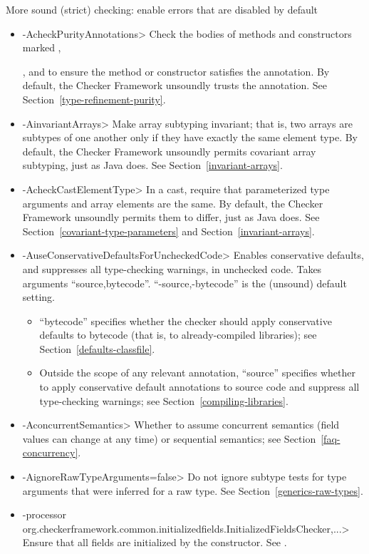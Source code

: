 \label{unsound-by-default}
More sound (strict) checking: enable errors that are disabled by default
\begin{itemize}
\item \<-AcheckPurityAnnotations>
  Check the bodies of methods and constructors marked
  ,

  ,
  and 
  to ensure the method or constructor satisfies the annotation.  By default,
  the Checker Framework unsoundly trusts the annotation.  See
  Section~\ref{type-refinement-purity}.
\item \<-AinvariantArrays>
  Make array subtyping invariant; that is, two arrays are subtypes of one
  another only if they have exactly the same element type.  By default,
  the Checker Framework unsoundly permits covariant array subtyping, just
  as Java does.  See Section~\ref{invariant-arrays}.
\item \<-AcheckCastElementType>
  In a cast, require that parameterized type arguments and array elements
  are the same.  By default, the Checker Framework unsoundly permits them
  to differ, just as Java does.  See Section~\ref{covariant-type-parameters}
  and Section~\ref{invariant-arrays}.
\item \<-AuseConservativeDefaultsForUncheckedCode>
  Enables conservative defaults, and suppresses all type-checking warnings,
  in unchecked code.  Takes arguments ``source,bytecode''.
  ``-source,-bytecode'' is the (unsound) default setting.
  \begin{itemize}
  \item
  ``bytecode'' specifies
  whether the checker should apply conservative defaults to
  bytecode (that is, to already-compiled libraries); see
  Section~\ref{defaults-classfile}.
  \item
  Outside the scope of any relevant
   annotation, ``source'' specifies whether to apply conservative
  default annotations to source code and suppress all type-checking warnings; see
  Section~\ref{compiling-libraries}.
  \end{itemize}
\item \<-AconcurrentSemantics>
  Whether to assume concurrent semantics (field values can change at any
  time) or sequential semantics; see Section~\ref{faq-concurrency}.
\item \<-AignoreRawTypeArguments=false>
  Do not ignore subtype tests for type arguments that were inferred for a
  raw type.  See Section~\ref{generics-raw-types}.
\item \<-processor org.checkerframework.common.initializedfields.InitializedFieldsChecker,...>
  Ensure that all fields are initialized by the constructor.  See
  .
\end{itemize}

